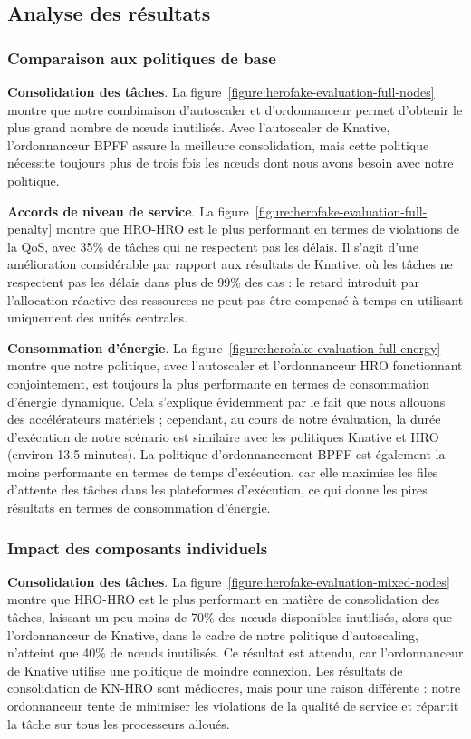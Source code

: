\subsection{Analyse des résultats}

\subsubsection{Comparaison aux politiques de base}

\textbf{Consolidation des tâches}. La figure~\ref{figure:herofake-evaluation-full-nodes} montre que notre combinaison d'autoscaler et d'ordonnanceur permet d'obtenir le plus grand nombre de nœuds inutilisés. Avec l'autoscaler de Knative, l'ordonnanceur BPFF assure la meilleure consolidation, mais cette politique nécessite toujours plus de trois fois les nœuds dont nous avons besoin avec notre politique.

\textbf{Accords de niveau de service}. La figure~\ref{figure:herofake-evaluation-full-penalty} montre que HRO-HRO est le plus performant en termes de violations de la QoS, avec 35\% de tâches qui ne respectent pas les délais. Il s'agit d'une amélioration considérable par rapport aux résultats de Knative, où les tâches ne respectent pas les délais dans plus de 99\% des cas : le retard introduit par l'allocation réactive des ressources ne peut pas être compensé à temps en utilisant uniquement des unités centrales.

\textbf{Consommation d'énergie}. La figure~\ref{figure:herofake-evaluation-full-energy} montre que notre politique, avec l'autoscaler et l'ordonnanceur HRO fonctionnant conjointement, est toujours la plus performante en termes de consommation d'énergie dynamique. Cela s'explique évidemment par le fait que nous allouons des accélérateurs matériels ; cependant, au cours de notre évaluation, la durée d'exécution de notre scénario est similaire avec les politiques Knative et HRO (environ 13,5 minutes). La politique d'ordonnancement BPFF est également la moins performante en termes de temps d'exécution, car elle maximise les files d'attente des tâches dans les plateformes d'exécution, ce qui donne les pires résultats en termes de consommation d'énergie.

\subsubsection{Impact des composants individuels}

\textbf{Consolidation des tâches}. La figure~\ref{figure:herofake-evaluation-mixed-nodes} montre que HRO-HRO est le plus performant en matière de consolidation des tâches, laissant un peu moins de 70\% des nœuds disponibles inutilisés, alors que l'ordonnanceur de Knative, dans le cadre de notre politique d'autoscaling, n'atteint que 40\% de nœuds inutilisés. Ce résultat est attendu, car l'ordonnanceur de Knative utilise une politique de moindre connexion. Les résultats de consolidation de KN-HRO sont médiocres, mais pour une raison différente : notre ordonnanceur tente de minimiser les violations de la qualité de service et répartit la tâche sur tous les processeurs alloués.

